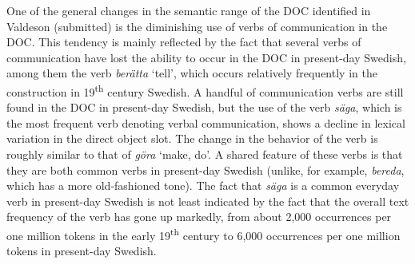 \documentclass[output=paper]{langscibook}
\begin{document}
One of the general changes in the semantic range of the DOC identified in Valdeson (submitted) is the diminishing use of verbs of communication in the DOC. This tendency is mainly reflected by the fact that several verbs of communication have lost the ability to occur in the DOC in present-day Swedish, among them the verb \textit{berätta} ‘tell’, which occurs relatively frequently in the construction in 19\textsuperscript{th} century Swedish. A handful of communication verbs are still found in the DOC in present-day Swedish, but the use of the verb \textit{säga}, which is the most frequent verb denoting verbal communication, shows a decline in lexical variation in the direct object slot. The change in the behavior of the verb is roughly similar to that of \textit{göra} ‘make, do’. A shared feature of these verbs is that they are both common verbs in present-day Swedish (unlike, for example, \textit{bereda}, which has a more old-fashioned tone). The fact that \textit{säga} is a common everyday verb in present-day Swedish is not least indicated by the fact that the overall text frequency of the verb has gone up markedly, from about 2,000 occurrences per one million tokens in the early 19\textsuperscript{th} century to 6,000 occurrences per one million tokens in present-day Swedish.


\begin{table}
\caption{Frequency measures of the verb-specific DOC with \textit{säga} ‘say, tell’}
\label{tab:valdeson:11}
\end{table}
\end{document}
